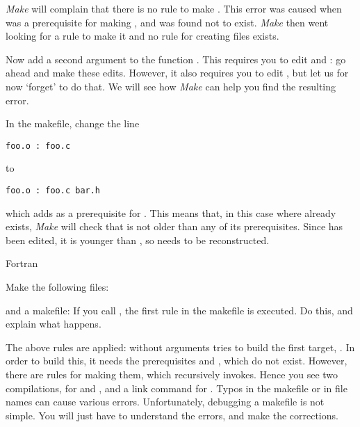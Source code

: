   {\emph{Make} will complain that there is no rule to make
    . This error was caused when  was a
    prerequisite for making , and was found not to exist. 
    \emph{Make} then went
    looking for a rule to make it and no rule for creating 
    files exists.}{}

Now add a second argument to the function . This requires you
to edit  and : go ahead and make these
edits. However, it also requires you to edit , but let us for
now `forget' to do that. We will see how \emph{Make} can help you find
the resulting error.


In the makefile, change the line
\begin{verbatim}
foo.o : foo.c
\end{verbatim}
to
\begin{verbatim}
foo.o : foo.c bar.h
\end{verbatim}
which adds  as a prerequisite for . This means that,
in this case where  already exists, \emph{Make} will check
that  is not older than any of its prerequisites. Since
 has been edited, it is younger than , so 
needs to be reconstructed.


 {Fortran}

Make the following files:

and a makefile:
If you call , the first rule in the makefile is executed. Do
this, and explain what happens.

  {The above rules are applied:  without arguments tries to
    build the first target, . In order to build this, it
    needs the prerequisites  and , which do not
    exist. However, there are rules for making them, which 
    recursively invokes. Hence you see two compilations, for 
    and , and a link command for .}
  {Typos in the makefile or in file names can cause various
    errors. Unfortunately, debugging a makefile is not simple. You
    will just have to understand the errors, and make the
    corrections.}

